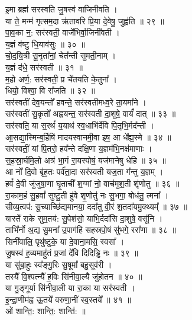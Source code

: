 इ॒मा ब्रह्म॑ सरस्वति जु॒षस्व॑ वाजिनीवति ।\\
या ते॒ मन्म॑ गृत्सम॒दा ऋ॑तावरि प्रि॒या दे॒वेषु॒ जुह्व॑ति ॥ २९ ॥\\
पा॒व॒का न॒: सर॑स्वती॒ वाजे᳚भिर्वा॒जिनी᳚वती ।\\
य॒ज्ञं व॑ष्टु धि॒याव॑सुः ॥ ३० ॥\\
चो॒द॒यि॒त्री सू॒नृता᳚नां॒ चेत᳚न्ती सुमती॒नाम् ।\\
य॒ज्ञं द॑धे॒ सर॑स्वती ॥ ३१ ॥\\
म॒हो अर्ण॒: सर॑स्वती॒ प्र चे᳚तयति के॒तुना᳚ ।\\
धियो॒ विश्वा॒ वि रा᳚जति ॥ ३२ ॥\\
सर॑स्वतीं देव॒यन्तो᳚ हवन्ते॒ सर॑स्वतीमध्व॒रे ता॒यमा᳚ने ।\\
सर॑स्वतीं सु॒कृतो᳚ अह्वयन्त॒ सर॑स्वती दा॒शुषे॒ वार्यं᳚ दात् ॥ ३३ ॥\\
सर॑स्वति॒ या स॒रथं᳚ य॒याथ॑ स्व॒धाभि॑र्देवि पि॒तृभि॒र्मद᳚न्ती ।\\
आ॒सद्या॒स्मिन्ब॒र्हिषि॑ मादयस्वानमी॒वा इष॒ आ धे᳚ह्य॒स्मे ॥ ३४ ॥\\
सर॑स्वतीं॒ यां पि॒तरो॒ हव᳚न्ते दक्षि॒णा य॒ज्ञम॑भि॒नक्ष॑माणाः ।\\
स॒ह॒स्रा॒र्घमि॒लो अत्र॑ भा॒गं रा॒यस्पोषं॒ यज॑मानेषु धेहि ॥ ३५ ॥\\
आ नो᳚ दि॒वो बृ॑ह॒तः पर्व॑ता॒दा सर॑स्वती यज॒ता ग᳚न्तु य॒ज्ञम् ।\\
हवं᳚ दे॒वी जु॑जुषा॒णा घृ॒ताची᳚ श॒ग्मां नो॒ वाच॑मुश॒ती शृ॑णोतु ॥ ३६ ॥\\
रा॒काम॒हं सु॒हवां᳚ सुष्टु॒ती हु॑वे शृ॒णोतु॑ नः सु॒भगा॒ बोध॑तु॒ त्मना᳚ ।\\
सीव्य॒त्वप॑: सू॒च्याच्छि॑द्यमानया॒ ददा᳚तु वी॒रं श॒तदा᳚यमु॒क्थ्यम्᳚ ॥ ३७ ॥\\
यास्ते᳚ राके सुम॒तय॑: सु॒पेश॑सो॒ याभि॒र्ददा᳚सि दा॒शुषे॒ वसू᳚नि ।\\
ताभि᳚र्नो अ॒द्य सु॒मना᳚ उ॒पाग॑हि सहस्रपो॒षं सु॑भगे॒ ररा᳚णा ॥ ३८ ॥\\
सिनी᳚वालि॒ पृथु॑ष्टुके॒ या दे॒वाना॒मसि॒ स्वसा᳚ ।\\
जु॒षस्व॑ ह॒व्यमाहु॑तं प्र॒जां दे᳚वि दिदिड्ढि नः ॥ ३९ ॥\\
या सु॑बा॒हुः स्व᳚ङ्गु॒रिः सु॒षूमा᳚ बहु॒सूव॑री ।\\
तस्यै᳚ वि॒श्पत्न्यै᳚ ह॒विः सि॑नीवा॒ल्यै जु॑होतन ॥ ४० ॥\\
या गु॒ङ्गूर्या सि॑नीवा॒ली या रा॒का या सर॑स्वती ।\\
इ॒न्द्रा॒णीम॑ह्व ऊ॒तये᳚ वरुणा॒नीं स्व॒स्तये᳚ ॥ ४१ ॥\\
ओं शान्ति॒: शान्ति॒: शान्ति॑: ॥\\
